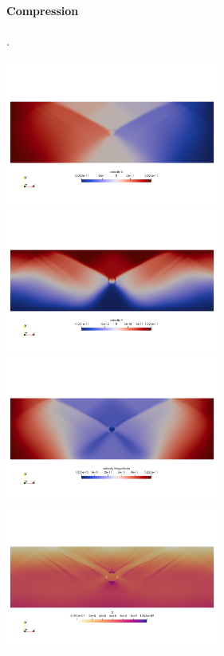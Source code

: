 \newpage
\paragraph{Compression}.

\begin{center}
\includegraphics[width=7cm]{python_codes/fieldstone_70/compression/u}
\includegraphics[width=7cm]{python_codes/fieldstone_70/compression/v}\\
\includegraphics[width=7cm]{python_codes/fieldstone_70/compression/vel}
\includegraphics[width=7cm]{python_codes/fieldstone_70/compression/q}\\

\end{center}
